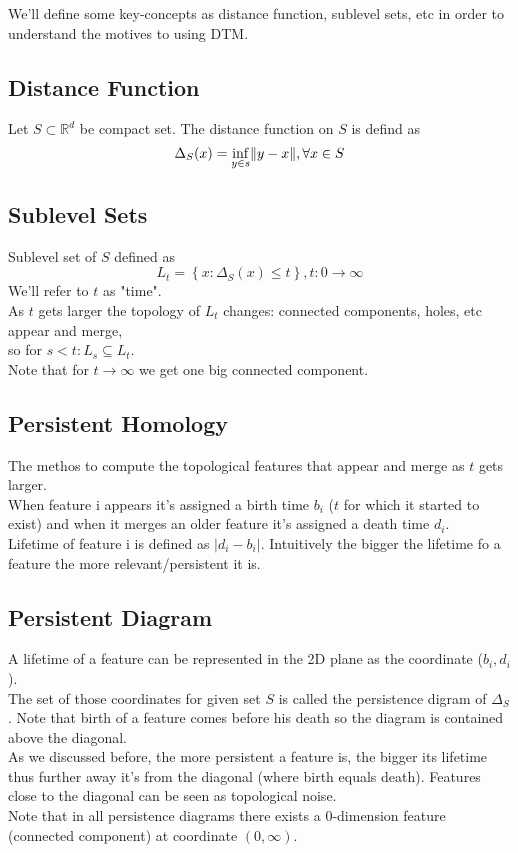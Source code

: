 \documentclass[11pt]{article}
\theoremstyle{definition}
\theoremstyle{definition}
\begin{document}
We'll define some key-concepts as distance function, sublevel sets, etc in order to understand the motives to using DTM.

\subsection{Distance Function}
Let $S \subset \mathbb{R}^d$ be compact set. The distance function on $S$ is defind as
$$\Delta_S(x) = \inf_{y \in s} \mathopen\| y-x \mathclose\|, \forall x \in S$$

\subsection{Sublevel Sets}
Sublevel set of $S$ defined as
$$L_t = \left\{ x: \Delta_S(x) \leq t \right\}, t: 0 \rightarrow \infty$$
We'll refer to $t$ as "time".\\
As $t$ gets larger the topology of $L_t$ changes: connected components, holes, etc appear and merge,\\ so for $s < t: L_s \subseteq L_t$.\\
Note that for $t \rightarrow \infty$ we get one big connected component.


\subsection{Persistent Homology}
The methos to compute the topological features that appear and merge as $t$ gets larger.\\
When feature i appears it's assigned a birth time $b_i$ ($t$ for which it started to exist) and when it merges an older feature it's assigned a death time $d_i$.\\
Lifetime of feature i is defined as $|d_i - b_i|$.
Intuitively the bigger the lifetime fo a feature the more relevant/persistent it is.

\subsection{Persistent Diagram}
A lifetime of a feature can be represented in the 2D plane as the coordinate ($b_i,d_i$).\\
The set of those coordinates for given set $S$ is called the persistence digram of $\Delta_S$. Note that birth of a feature comes before his death so the diagram is contained above the diagonal.\\
As we discussed before, the more persistent a feature is, the bigger its lifetime thus further away it's from the diagonal (where birth equals death). Features close to the diagonal can be seen as topological noise.\\
Note that in all persistence diagrams there exists a 0-dimension feature (connected component) at coordinate $(0,\infty)$.
\end{document}
